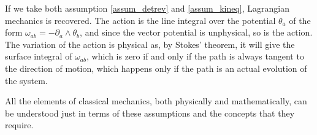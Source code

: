 If we take both assumption \ref{assum_detrev} and \ref{assum_kineq}, Lagrangian mechanics is recovered. The action is the line integral over the potential $\theta_a$ of the form $\omega_{ab} = - \partial_a \wedge \theta_b$, and since the vector potential is unphysical, so is the action. The variation of the action is physical as, by Stokes' theorem, it will give the surface integral of $\omega_{ab}$, which is zero if and only if the path is always tangent to the direction of motion, which happens only if the path is an actual evolution of the system.

All the elements of classical mechanics, both physically and mathematically, can be understood just in terms of these assumptions and the concepts that they require.


